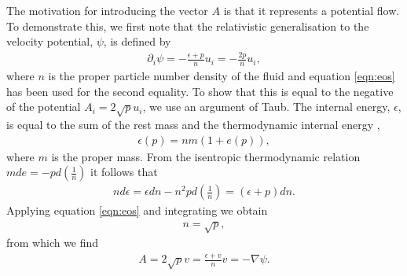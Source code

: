 \documentclass[10pt, fleqn,final,showtrims,oldfontcommands]{article} %
\newcommand{\eqnref}[1]{\ref{eqn:#1}}
\newcommand{\lr}[1]{\left( #1 \right)}
\renewcommand{\d}{\partial}
\newcommand{\del}{\nabla}
\begin{document}
The motivation for introducing the vector $A$ is that it represents a potential flow.
To demonstrate this, we first note that the relativistic generalisation to the velocity potential, $\psi$,  is defined by\cite{LandauBook}
\begin{align}
  \d_i \psi = - \frac{\epsilon+p}{n} u_i = - \frac{2 p}{n} u_i,
\end{align}
where $n$ is the proper particle number density of the fluid and equation \eqnref{eos} has been used for the second equality.
To show that this is equal to the negative of the potential $A_i = 2\sqrt p u_i$, we use an argument of Taub\cite{Taub1978}.
The internal energy, $\epsilon$, is equal to the sum of the rest mass and the thermodynamic internal energy \cite{LandauBook, Doran2003},
\begin{align}
  \epsilon(p) = nm( 1 + e(p)),
\end{align}
where $m$ is the proper mass.
From the isentropic thermodynamic relation $m de = - p d\lr{\frac{1}{n}}$
it follows that 
\begin{align}
 n d\epsilon = \epsilon dn - n^2 p d \lr{\frac{1}{n}} = \lr{\epsilon + p} dn.
\end{align}
Applying equation \eqnref{eos} and integrating we obtain
\begin{align}
n = \sqrt p,
\end{align}
from which we find
\begin{align}
A = 2\sqrt p  v = \frac{\epsilon + v}{n} v = - \del \psi.
\end{align}
\end{document}
